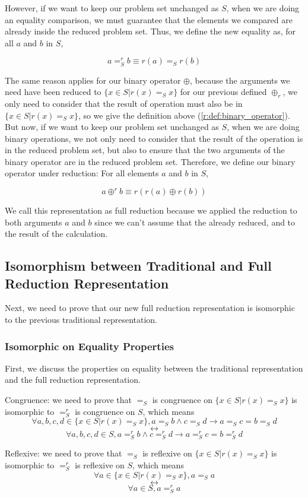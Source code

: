 \documentclass[a4paper,12pt,twoside,openright]{report}
\newcommand{\e}[2]{
\begin{equation}
  \label{#1} 
  #2
\end{equation}
}
\begin{document}
However, if we want to keep our problem set unchanged as $S$, when we are doing an equality comparison, we must guarantee that the elements we compared are already inside the reduced problem set. Thus, we define the new equality as, for all $a$ and $b$ in $S$,
\e{gr:def:eq}{a =^r_S b \equiv r(a) =_S r(b)}
The same reason applies for our binary operator  $\oplus$, because the arguments we need have been reduced to $\{x \in S | r(x) =_S x \}$ for our previous defined $\oplus_r$, we only need to consider that the result of operation must also be in $\{x \in S | r(x) =_S x\}$, so we give the definition above (\ref{r:def:binary_operator}).
But now, if we want to keep our problem set unchanged as $S$, when we are doing binary operations, we not only need to consider that the result of the operation is in the reduced problem set, but also to ensure that the two arguments of the binary operator are in the reduced problem set. Therefore, we define our binary operator under reduction: For all elements $a$ and $b$ in $S$,
\e{gr:def:binary_operator}{a \oplus^r b \equiv r(r(a) \oplus r(b))}
We call this representation as full reduction because we applied the reduction to both arguments $a$ and $b$ since we can't assume that the already reduced, and to the result of the calculation.


\subsection{Isomorphism between Traditional and Full Reduction Representation}
Next, we need to prove that our new full reduction representation is isomorphic to the previous traditional representation.

\subsubsection{Isomorphic on Equality Properties}
First, we discuss the properties on equality between the traditional representation and the full reduction representation.

Congruence: we need to prove that $=_S$ is congruence on $\{x \in S | r(x) =_S x\}$ is isomorphic to $=^r_S$ is congruence on $S$, which means 
\[\forall a,b,c,d \in \{x \in S | r(x) =_S x \}, a =_S b \wedge c =_S d \rightarrow a =_S c = b =_S d \]
\[\longleftrightarrow \]
\[\forall a,b,c,d \in S, a =^r_S b \wedge c =^r_S d \rightarrow a =^r_S c = b =^r_S d
\]

Reflexive: we need to prove that $=_S$ is reflexive on $\{x \in S | r(x) =_S x \}$ is isomorphic to $=^r_S$ is reflexive on $S$, which means 
\[\forall a \in \{x \in S | r(x) =_S x \}, a =_S a \]
\[\longleftrightarrow \]
\[\forall a \in S, a =^r_S a
\]
\end{document}
